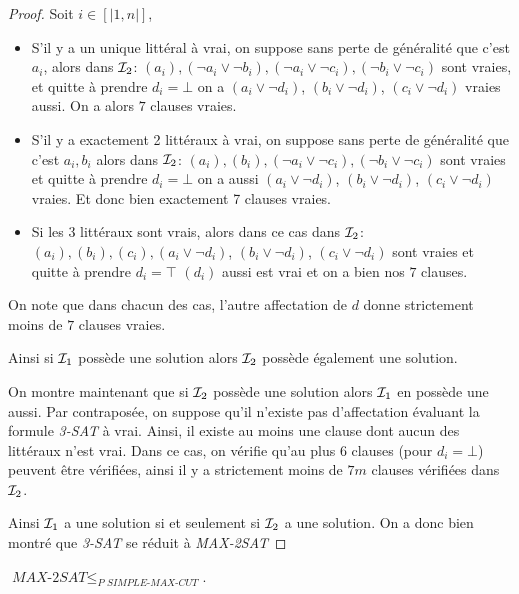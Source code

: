 \documentclass{standalone}
\begin{document}
\begin{proof}
	Soit $i \in [|1, n|]$, 
		\begin{itemize}
			\item S'il y a un unique littéral à vrai, on suppose sans perte de généralité que c'est $a_i$, alors dans $\mathcal I_2$: $(a_i), (\neg a_i \lor \neg b_i), (\neg a_i \lor \neg c_i), (\neg b_i \lor \neg c_i)$ sont vraies, et quitte à prendre $d_i=\bot$ on a  $(a_i \lor \neg d_i)$, $(b_i \lor \neg d_i)$, $(c_i \lor \neg d_i)$ vraies aussi. On a alors $7$ clauses vraies.
			\item S'il y a exactement 2 littéraux à vrai, on suppose sans perte de généralité que c'est $a_i, b_i$ alors dans $\mathcal I_2$: $(a_i), (b_i), (\neg a_i \lor \neg c_i), (\neg b_i \lor \neg c_i)$ sont vraies et quitte à prendre $d_i=\bot$ on a aussi $(a_i \lor \neg d_i)$, $(b_i \lor \neg d_i)$, $(c_i \lor \neg d_i)$ vraies. Et donc bien exactement 7 clauses vraies.
			\item Si les 3 littéraux sont vrais, alors dans ce cas dans $\mathcal I_2$: $(a_i), (b_i), (c_i), (a_i \lor \neg d_i)$, $(b_i \lor \neg d_i)$, $(c_i \lor \neg d_i)$ sont vraies et quitte à prendre $d_i=\top$ $(d_i)$ aussi est vrai et on a bien nos $7$ clauses.
		\end{itemize}
	
	On note que dans chacun des cas, l'autre affectation de $d$ donne strictement moins de $7$ clauses vraies.
	
	Ainsi si $\mathcal I_1$ possède une solution alors $\mathcal I_2$ possède également une solution.
	
	On montre maintenant que si $\mathcal I_2$ possède une solution alors $\mathcal I_1$ en possède une aussi. Par contraposée, on suppose qu'il n'existe pas d'affectation évaluant la formule \textit{3-SAT} à vrai. Ainsi, il existe au moins une clause dont aucun des littéraux n'est vrai. Dans ce cas, on vérifie qu'au plus $6$ clauses (pour $d_i = \bot$) peuvent être vérifiées, ainsi il y a strictement moins de $7m$ clauses vérifiées dans $\mathcal I_2$.
	
	Ainsi $\mathcal I_1$ a une solution si et seulement si $\mathcal I_2$ a une solution. On a donc bien montré que \textit{3-SAT} se réduit à \textit{MAX-2SAT}	
\end{proof}

\begin{thm}
	$\textit{MAX-2SAT} \leq_\textit{P SIMPLE-MAX-CUT}$.
\end{thm}
\end{document}
